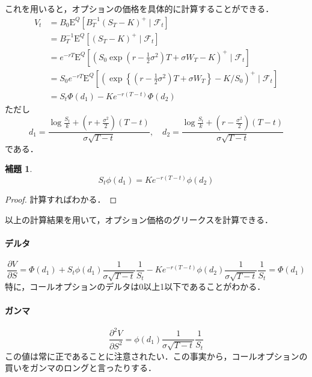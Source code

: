 \documentclass{jsarticle}
\theoremstyle{definition}
\newtheorem{lem}[dfn]{補題}
\begin{document}
これを用いると，オプションの価格を具体的に計算することができる．
\begin{align*}
    V_t &= B_0 \mathrm{E}^Q\left[B_T^{-1} (S_T - K)^+ \mid \mathscr{F}_t\right]\\
    &= B_T^{-1}\mathrm{E}^Q\left[(S_T - K)^+ \mid \mathscr{F}_t\right]\\
    &= e^{-rT}\mathrm{E}^Q\left[\left(S_0\exp{(r - \frac{1}{2}\sigma^2)T + \sigma W_T} - K\right)^+ \mid \mathscr{F}_t\right]\\
    &= S_0 e^{-rT}\mathrm{E}^Q\left[\left(\exp{\left\{(r - \frac{1}{2}\sigma^2)T + \sigma W_T\right\}} - K / S_0\right)^+ \mid \mathscr{F}_t\right]\\
    &= S_t \Phi(d_1) - Ke^{-r(T - t)}\Phi(d_2)
\end{align*}
ただし
$$
    d_1 = \frac{\log{\frac{S_t}{k}} + (r + \frac{\sigma^2}{2}) (T - t)}{\sigma\sqrt{T - t}}, \quad d_2 = \frac{\log{\frac{S_t}{k}} + (r - \frac{\sigma^2}{2}) (T - t)}{\sigma\sqrt{T - t}}
$$
である．

\begin{lem}
    $$
    S_t \phi(d_1) = Ke^{-r(T - t)}\phi(d_2)
    $$
\end{lem}
\begin{proof}
    計算すればわかる．
\end{proof}

以上の計算結果を用いて，オプション価格のグリークスを計算できる．

\paragraph{デルタ}
\begin{equation*}
    \frac{\partial V}{\partial S} = \Phi(d_1) + S_t \phi(d_1) \frac{1}{\sigma \sqrt{T - t}}\frac{1}{S_t} - Ke^{-r(T - t)}\phi(d_2) \frac{1}{\sigma\sqrt{T - t}}\frac{1}{S_t} = \Phi(d_1)
\end{equation*}
特に，コールオプションのデルタは0以上1以下であることがわかる．

\paragraph{ガンマ}
\begin{equation*}
    \frac{\partial^2 V}{\partial S^2} = \phi(d_1)\frac{1}{\sigma\sqrt{T - t}}\frac{1}{S_t}
\end{equation*}
この値は常に正であることに注意されたい．この事実から，コールオプションの買いをガンマのロングと言ったりする．
\end{document}
